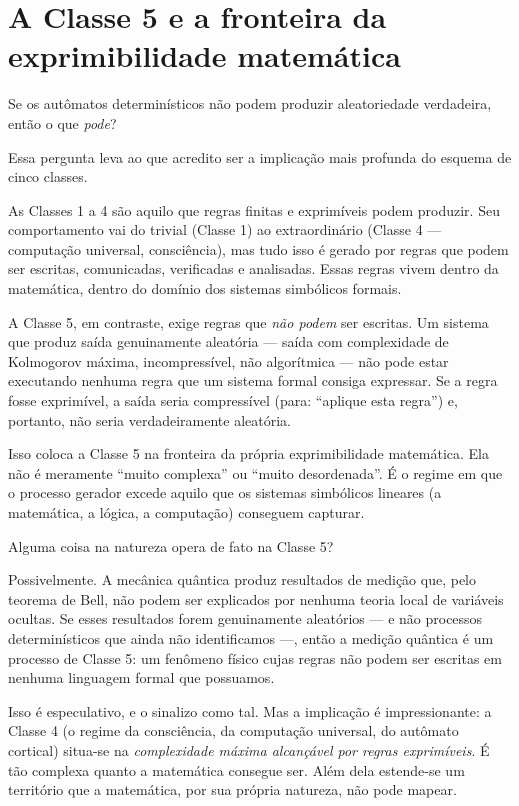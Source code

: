 \documentclass[11pt, twoside, openright]{book}
\begin{document}
\section*{A Classe 5 e a fronteira da exprimibilidade matemática}

Se os autômatos determinísticos não podem produzir aleatoriedade verdadeira, então o que \textit{pode}?

Essa pergunta leva ao que acredito ser a implicação mais profunda do esquema de cinco classes.

As Classes 1 a 4 são aquilo que regras finitas e exprimíveis podem produzir. Seu comportamento vai do trivial (Classe 1) ao extraordinário (Classe 4 --- computação universal, consciência), mas tudo isso é gerado por regras que podem ser escritas, comunicadas, verificadas e analisadas. Essas regras vivem dentro da matemática, dentro do domínio dos sistemas simbólicos formais.

A Classe 5, em contraste, exige regras que \textit{não podem} ser escritas. Um sistema que produz saída genuinamente aleatória --- saída com complexidade de Kolmogorov máxima, incompressível, não algorítmica --- não pode estar executando nenhuma regra que um sistema formal consiga expressar. Se a regra fosse exprimível, a saída seria compressível (para: ``aplique esta regra'') e, portanto, não seria verdadeiramente aleatória.

Isso coloca a Classe 5 na fronteira da própria exprimibilidade matemática. Ela não é meramente ``muito complexa'' ou ``muito desordenada''. É o regime em que o processo gerador excede aquilo que os sistemas simbólicos lineares (a matemática, a lógica, a computação) conseguem capturar.

Alguma coisa na natureza opera de fato na Classe 5?

Possivelmente. A mecânica quântica produz resultados de medição que, pelo teorema de Bell, não podem ser explicados por nenhuma teoria local de variáveis ocultas. Se esses resultados forem genuinamente aleatórios --- e não processos determinísticos que ainda não identificamos ---, então a medição quântica é um processo de Classe 5: um fenômeno físico cujas regras não podem ser escritas em nenhuma linguagem formal que possuamos.

Isso é especulativo, e o sinalizo como tal. Mas a implicação é impressionante: a Classe 4 (o regime da consciência, da computação universal, do autômato cortical) situa-se na \textit{complexidade máxima alcançável por regras exprimíveis}. É tão complexa quanto a matemática consegue ser. Além dela estende-se um território que a matemática, por sua própria natureza, não pode mapear.
\end{document}
